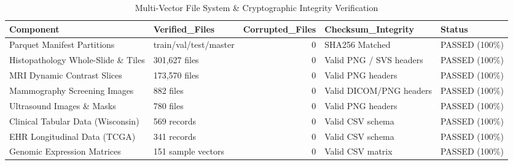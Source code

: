 \begin{table}
\caption{Multi-Vector File System & Cryptographic Integrity Verification}
\label{tab:table_integrity_validation}
\begin{tabular}{llrll}
\toprule
Component & Verified\_Files & Corrupted\_Files & Checksum\_Integrity & Status \\
\midrule
Parquet Manifest Partitions & train/val/test/master & 0 & SHA256 Matched & PASSED (100\%) \\
Histopathology Whole-Slide \& Tiles & 301,627 files & 0 & Valid PNG / SVS headers & PASSED (100\%) \\
MRI Dynamic Contrast Slices & 173,570 files & 0 & Valid PNG headers & PASSED (100\%) \\
Mammography Screening Images & 882 files & 0 & Valid DICOM/PNG headers & PASSED (100\%) \\
Ultrasound Images \& Masks & 780 files & 0 & Valid PNG headers & PASSED (100\%) \\
Clinical Tabular Data (Wisconsin) & 569 records & 0 & Valid CSV schema & PASSED (100\%) \\
EHR Longitudinal Data (TCGA) & 341 records & 0 & Valid CSV schema & PASSED (100\%) \\
Genomic Expression Matrices & 151 sample vectors & 0 & Valid CSV matrix & PASSED (100\%) \\
\bottomrule
\end{tabular}
\end{table}
